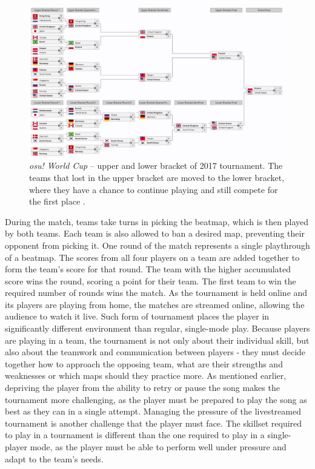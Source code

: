 \begin{figure}[h]
    \centering\includegraphics[scale=0.465]{obrazki/osuworldcup.png}
    \caption{\textit{osu! World Cup} -- upper and lower bracket of 2017 tournament. The teams that lost in the upper bracket are moved to the lower bracket, where they have a chance to continue playing and still compete for the first place \cite{2017osu}.}
    \label{fig:osuworldcup}
\end{figure}

During the match, teams take turns in picking the beatmap, which is then played by both teams. Each team is also allowed to ban a desired map, preventing their opponent from picking it. One round of the match represents a single playthrough of a beatmap. The scores from all four players on a team are added together to form the team’s score for that round. The team with the higher accumulated score wins the round, scoring a point for their team. The first team to win the required number of rounds wins the match. As the tournament is held online and its players are playing from home, the matches are streamed online, allowing the audience to watch it live.
Such form of tournament places the player in significantly different environment than regular, single-mode play. Because players are playing in a team, the tournament is not only about their individual skill, but also about the teamwork and communication between players - they must decide together how to approach the opposing team, what are their strengths and weaknesses or which maps should they practice more. As mentioned earlier, depriving the player from the ability to retry or pause the song makes the tournament more challenging, as the player must be prepared to play the song as best as they can in a single attempt. Managing the pressure of the livestreamed tournament is another challenge that the player must face. The skillset required to play in a tournament is different than the one required to play in a single-player mode, as the player must be able to perform well under pressure and adapt to the team’s needs.

